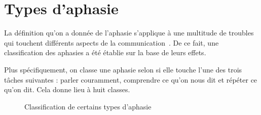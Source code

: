 \section{Types d'aphasie}

La définition qu'on a donnée de l'aphasie s'applique à une multitude de troubles  
qui touchent différents aspects de la communication~\cite[p. 135, 136]{Hallowell_2017}.
De ce fait, une classification des aphasies a été établie sur la base de leurs effets.

Plus spécifiquement, on classe une aphasie selon si elle touche l'une des trois tâches suivantes :
parler couramment, comprendre ce qu'on nous dit et répéter ce qu'on dit. 
Cela donne lieu à huit classes.

\begin{figure}
    \begin{center}
        \resizebox{\textwidth}{!}{}
    \end{center}
    \caption[Classification de certains types d'aphasie]
    {Classification de certains types d'aphasie~\cite{Sreedharan_2018}}
\end{figure}


